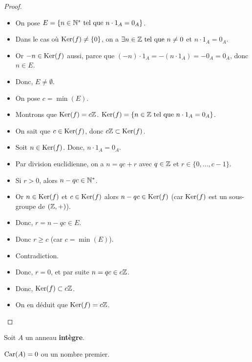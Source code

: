 \documentclass[12pt,a4paper]{report}
\begin{document}
\begin{proof}
    \begin{itemize}
        \item On pose $E=\{n\in\mathbb{N}^*\text{ tel que } n\cdot1_A = 0_A\}$.

        \item Dans le cas où $\mathrm{Ker}(f) \neq \{0\}$, on a $\exists n \in \mathbb{Z} \text{ tel que } n \neq 0$ et $n\cdot 1_A = 0_A$.

        \item Or $-n \in \mathrm{Ker}(f)$ aussi, parce que $(-n)\cdot 1_A = -(n\cdot 1_A) = -0_A = 0_A$, donc $n \in E$.

        \item Donc, $E \neq \emptyset$.

        \item On pose $c=\min(E)$.
        
        \item Montrons que $\mathrm{Ker}(f) = c\mathbb{Z}$. $\mathrm{Ker}(f) = \{n\in\mathbb{Z} \text{ tel que } n\cdot 1_A = 0_A\}$.

        \item On sait que $c \in \mathrm{Ker}(f)$, donc $c\mathbb{Z} \subset \mathrm{Ker}(f)$.

        \item Soit $n \in \mathrm{Ker}(f)$. Donc, $n\cdot 1_A = 0_A$.

        \item Par division euclidienne, on a $n = qc + r$ avec $q \in \mathbb{Z}$ et $r \in \{0, \ldots, c-1\}$.

        \item Si $r>0$, alors $n-qc\in\mathbb{N}^*$.
        \item Or $n\in\mathrm{Ker}(f)$ et $c\in\mathrm{Ker}(f)$ alors $n - qc \in \mathrm{Ker}(f)$ (car $\mathrm{Ker}(f)$ est un sous-groupe de $(\mathbb{Z},+)$).
        \item Donc, $r = n - qc \in E$.
        \item Donc $r \ge c$ (car $c = \min(E)$).
        \item Contradiction.
        \item Donc, $r=0$, et par suite $n = qc \in c\mathbb{Z}$.
        \item Donc, $\mathrm{Ker}(f) \subset c\mathbb{Z}$.
        \item On en déduit que $\mathrm{Ker}(f) = c\mathbb{Z}$.
    \end{itemize}
    
\end{proof}

\begin{property}
    Soit $A$ un anneau \textbf{intègre}.
    
    $\mathrm{Car}(A) = 0$ ou un nombre premier.
\end{property}
\end{document}
